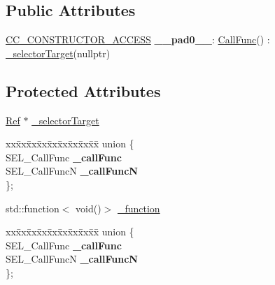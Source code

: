 \subsection*{Public Attributes}
\begin{DoxyCompactItemize}
\item 
\mbox{\label{classCallFunc_a6b4c65a2f33551288d87011082519c01}} 
\hyperlink{_2cocos2d_2cocos_2base_2ccConfig_8h_a25ef1314f97c35a2ed3d029b0ead6da0}{C\+C\+\_\+\+C\+O\+N\+S\+T\+R\+U\+C\+T\+O\+R\+\_\+\+A\+C\+C\+E\+SS} {\bfseries \+\_\+\+\_\+pad0\+\_\+\+\_\+}\+: \hyperlink{classCallFunc}{Call\+Func}() \+: \hyperlink{classCallFunc_a4d863ca8d69741dd4904afbf90dba449}{\+\_\+selector\+Target}(nullptr)
\end{DoxyCompactItemize}
\subsection*{Protected Attributes}
\begin{DoxyCompactItemize}
\item 
\hyperlink{classRef}{Ref} $\ast$ \hyperlink{classCallFunc_a4d863ca8d69741dd4904afbf90dba449}{\+\_\+selector\+Target}
\item 
\mbox{\label{classCallFunc_afaf16b73d835aba15daffa4be1d534c2}} 
\begin{tabbing}
xx\=xx\=xx\=xx\=xx\=xx\=xx\=xx\=xx\=\kill
union \{\\
\>SEL\_CallFunc {\bfseries \_callFunc}\\
\>SEL\_CallFuncN {\bfseries \_callFuncN}\\
\}; \\

\end{tabbing}\item 
std\+::function$<$ void()$>$ \hyperlink{classCallFunc_a7addb2ce818527caf7ae440a3a4abe23}{\+\_\+function}
\item 
\mbox{\label{classCallFunc_a05595bf0eb474fe9c0bafbe5b34cd3ac}} 
\begin{tabbing}
xx\=xx\=xx\=xx\=xx\=xx\=xx\=xx\=xx\=\kill
union \{\\
\>SEL\_CallFunc {\bfseries \_callFunc}\\
\>SEL\_CallFuncN {\bfseries \_callFuncN}\\
\}; \\

\end{tabbing}\end{DoxyCompactItemize}
